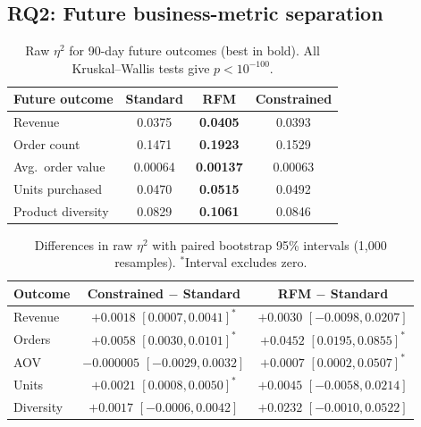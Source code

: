 \documentclass[conference,10pt]{IEEEtran}
\newcommand{\etasq}{\eta^{2}}
\begin{document}
\subsection{RQ2: Future business-metric separation}

\begin{table}[t]
\centering
\caption{Raw $\etasq$ for 90-day future outcomes (best in bold). All
Kruskal--Wallis tests give $p<10^{-100}$.}
\label{tab:eta}
\footnotesize
\setlength{\tabcolsep}{4pt}
\begin{tabular}{lccc}
\toprule
\textbf{Future outcome} & \textbf{Standard} & \textbf{RFM} & \textbf{Constrained}\\
\midrule
Revenue           & 0.0375 & \textbf{0.0405} & 0.0393\\
Order count       & 0.1471 & \textbf{0.1923} & 0.1529\\
Avg.\ order value & 0.00064 & \textbf{0.00137} & 0.00063\\
Units purchased   & 0.0470 & \textbf{0.0515} & 0.0492\\
Product diversity & 0.0829 & \textbf{0.1061} & 0.0846\\
\bottomrule
\end{tabular}
\end{table}

\begin{table}[t]
\centering
\caption{Differences in raw $\etasq$ with paired bootstrap 95\% intervals
(1,000 resamples). $^{*}$Interval excludes zero.}
\label{tab:boot}
\scriptsize
\setlength{\tabcolsep}{2.5pt}
\begin{tabular}{lcc}
\toprule
\textbf{Outcome} & \textbf{Constrained $-$ Standard} & \textbf{RFM $-$ Standard}\\
\midrule
Revenue   & $+0.0018$ $[0.0007, 0.0041]^{*}$ & $+0.0030$ $[-0.0098, 0.0207]$\\
Orders    & $+0.0058$ $[0.0030, 0.0101]^{*}$ & $+0.0452$ $[0.0195, 0.0855]^{*}$\\
AOV       & $-0.000005$ $[-0.0029, 0.0032]$  & $+0.0007$ $[0.0002, 0.0507]^{*}$\\
Units     & $+0.0021$ $[0.0008, 0.0050]^{*}$ & $+0.0045$ $[-0.0058, 0.0214]$\\
Diversity & $+0.0017$ $[-0.0006, 0.0042]$  & $+0.0232$ $[-0.0010, 0.0522]$\\
\bottomrule
\end{tabular}
\end{table}
\end{document}
